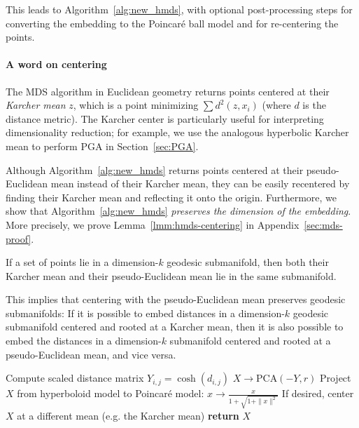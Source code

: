 This leads to Algorithm~\ref{alg:new_hmds}, with optional post-processing steps for converting the embedding to the Poincar{\'e} ball model and for re-centering the points.


\paragraph*{A word on centering}
The MDS algorithm in Euclidean geometry returns points centered at their \emph{Karcher mean} $z$, which is a point minimizing $\sum d^2(z, x_i)$ (where $d$ is the distance metric).
The Karcher center is particularly useful for interpreting dimensionality reduction; for example, we use the analogous hyperbolic Karcher mean to perform PGA in Section~\ref{sec:PGA}.

Although Algorithm~\ref{alg:new_hmds} returns points centered at their pseudo-Euclidean mean instead of their Karcher mean, they can be easily recentered
by finding their Karcher mean and reflecting it onto the origin. 
Furthermore, we show that Algorithm~\ref{alg:new_hmds} \emph{preserves the dimension of the embedding}.
More precisely, we prove Lemma~\ref{lmm:hmds-centering} in Appendix~\ref{sec:mds-proof}.
\begin{lemma}
  \label{lmm:hmds-centering}
  If a set of points lie in a dimension-$k$ geodesic submanifold, then both their Karcher mean and their pseudo-Euclidean mean lie in the same submanifold.
\end{lemma}
This implies that centering with the pseudo-Euclidean mean preserves geodesic submanifolds:
If it is possible to embed distances in a dimension-$k$ geodesic submanifold centered and rooted at a Karcher mean, then it is also possible to embed the distances in a dimension-$k$ submanifold centered and rooted at a pseudo-Euclidean mean, and vice versa.


\begin{algorithm}[t]
\caption{ }
\begin{algorithmic}[1]
\STATE Compute scaled distance matrix $Y_{i,j} = \cosh(d_{i,j})$
\STATE $X \rightarrow \text{PCA}(-Y,r)$
\STATE Project $X$ from hyperboloid model to Poincar\'{e} model: $x \to \frac{x}{1 + \sqrt{1 + \|x\|^2}}$
\STATE If desired, center $X$ at a different mean (e.g. the Karcher mean)
\STATE \textbf{return} $X$
\end{algorithmic}
\label{alg:new_hmds}
\end{algorithm}


